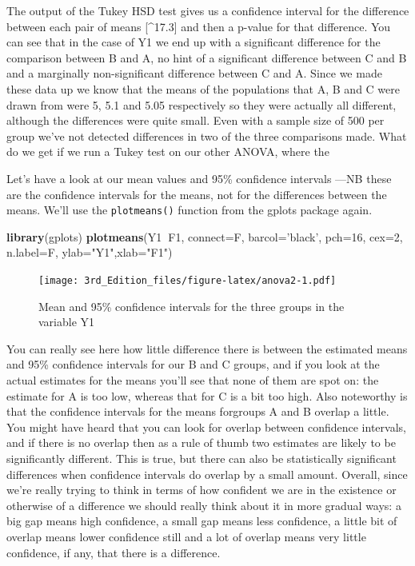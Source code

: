 \documentclass[
]{book}
\newenvironment{Shaded}{\begin{snugshade}}{\end{snugshade}}
\newcommand{\DataTypeTok}[1]{\textcolor[rgb]{0.13,0.29,0.53}{#1}}
\newcommand{\DecValTok}[1]{\textcolor[rgb]{0.00,0.00,0.81}{#1}}
\newcommand{\KeywordTok}[1]{\textcolor[rgb]{0.13,0.29,0.53}{\textbf{#1}}}
\newcommand{\NormalTok}[1]{#1}
\newcommand{\OperatorTok}[1]{\textcolor[rgb]{0.81,0.36,0.00}{\textbf{#1}}}
\newcommand{\StringTok}[1]{\textcolor[rgb]{0.31,0.60,0.02}{#1}}
\begin{document}
The output of the Tukey HSD test gives us a confidence interval for the difference between each pair of means {[}\^{}17.3{]} and then a p-value for that difference. You can see that in the case of Y1 we end up with a significant difference for the comparison between B and A, no hint of a significant difference between C and B and a marginally non-significant difference between C and A. Since we made these data up we know that the means of the populations that A, B and C were drawn from were 5, 5.1 and 5.05 respectively so they were actually all different, although the differences were quite small. Even with a sample size of 500 per group we've not detected differences in two of the three comparisons made. What do we get if we run a Tukey test on our other ANOVA, where the

Let's have a look at our mean values and 95\% confidence intervals ---NB these are the confidence intervals for the means, not for the differences between the means. We'll use the \texttt{plotmeans()} function from the gplots package again.

\begin{Shaded}
\begin{Highlighting}[]
\KeywordTok{library}\NormalTok{(gplots)}
\KeywordTok{plotmeans}\NormalTok{(Y1}\OperatorTok{~}\NormalTok{F1, }\DataTypeTok{connect=}\NormalTok{F, }\DataTypeTok{barcol=}\StringTok{'black'}\NormalTok{, }\DataTypeTok{pch=}\DecValTok{16}\NormalTok{, }\DataTypeTok{cex=}\DecValTok{2}\NormalTok{, }\DataTypeTok{n.label=}\NormalTok{F, }\DataTypeTok{ylab=}\StringTok{"Y1"}\NormalTok{,}\DataTypeTok{xlab=}\StringTok{"F1"}\NormalTok{)}
\end{Highlighting}
\end{Shaded}

\begin{figure}
\centering
\texttt{[image: 3rd\_Edition\_files/figure-latex/anova2-1.pdf]}
\caption{\label{fig:anova2}Mean and 95\% confidence intervals for the three groups in the variable Y1}
\end{figure}

You can really see here how little difference there is between the estimated means and 95\% confidence intervals for our B and C groups, and if you look at the actual estimates for the means you'll see that none of them are spot on: the estimate for A is too low, whereas that for C is a bit too high. Also noteworthy is that the confidence intervals for the means forgroups A and B overlap a little. You might have heard that you can look for overlap between confidence intervals, and if there is no overlap then as a rule of thumb two estimates are likely to be significantly different. This is true, but there can also be statistically significant differences when confidence intervals do overlap by a small amount. Overall, since we're really trying to think in terms of how confident we are in the existence or otherwise of a difference we should really think about it in more gradual ways: a big gap means high confidence, a small gap means less confidence, a little bit of overlap means lower confidence still and a lot of overlap means very little confidence, if any, that there is a difference.
\end{document}
